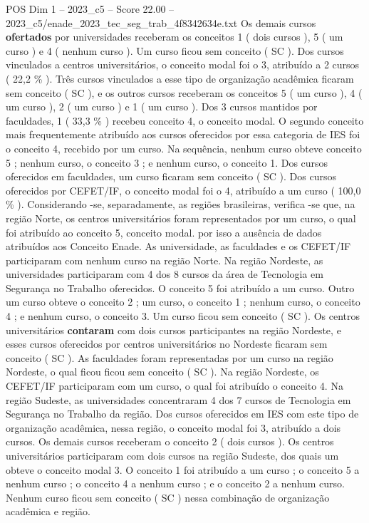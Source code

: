 \begin{textsample}{POS Dim 1 – 2023\_c5 – Score 22.00 – 2023\_c5/enade\_2023\_tec\_seg\_trab\_4f8342634e.txt}
Os demais cursos \textbf{ofertados} por universidades receberam os conceitos 1 ( dois cursos ), 5 ( um curso ) e 4 ( nenhum curso ).
Um curso ficou sem conceito ( SC ).
Dos cursos vinculados a centros universitários, o conceito modal foi o 3, atribuído a 2 cursos ( 22,2 \% ).
Três cursos vinculados a esse tipo de organização acadêmica ficaram sem conceito ( SC ), e os outros cursos receberam os conceitos 5 ( um curso ), 4 ( um curso ), 2 ( um curso ) e 1 ( um curso ).
Dos 3 cursos mantidos por faculdades, 1 ( 33,3 \% ) recebeu conceito 4, o conceito modal.
O segundo conceito mais frequentemente atribuído aos cursos oferecidos por essa categoria de IES foi o conceito 4, recebido por um curso.
Na sequência, nenhum curso obteve conceito 5 ; nenhum curso, o conceito 3 ; e nenhum curso, o conceito 1.
Dos cursos oferecidos em faculdades, um curso ficaram sem conceito ( SC ).
Dos cursos oferecidos por CEFET/IF, o conceito modal foi o 4, atribuído a um curso ( 100,0 \% ).
Considerando -se, separadamente, as regiões brasileiras, verifica -se que, na região Norte, os centros universitários foram representados por um curso, o qual foi atribuído ao conceito 5, conceito modal. por isso a ausência de dados atribuídos aos Conceito Enade.
As universidade, as faculdades e os CEFET/IF participaram com nenhum curso na região Norte.
Na região Nordeste, as universidades participaram com 4 dos 8 cursos da área de Tecnologia em Segurança no Trabalho oferecidos.
O conceito 5 foi atribuído a um curso.
Outro um curso obteve o conceito 2 ; um curso, o conceito 1 ; nenhum curso, o conceito 4 ; e nenhum curso, o conceito 3.
Um curso ficou sem conceito ( SC ).
Os centros universitários \textbf{contaram} com dois cursos participantes na região Nordeste, e esses cursos oferecidos por centros universitários no Nordeste ficaram sem conceito ( SC ).
As faculdades foram representadas por um curso na região Nordeste, o qual ficou ficou sem conceito ( SC ).
Na região Nordeste, os CEFET/IF participaram com um curso, o qual foi atribuído o conceito 4.
Na região Sudeste, as universidades concentraram 4 dos 7 cursos de Tecnologia em Segurança no Trabalho da região.
Dos cursos oferecidos em IES com este tipo de organização acadêmica, nessa região, o conceito modal foi 3, atribuído a dois cursos.
Os demais cursos receberam o conceito 2 ( dois cursos ).
Os centros universitários participaram com dois cursos na região Sudeste, dos quais um obteve o conceito modal 3.
O conceito 1 foi atribuído a um curso ; o conceito 5 a nenhum curso ; o conceito 4 a nenhum curso ; e o conceito 2 a nenhum curso.
Nenhum curso ficou sem conceito ( SC ) nessa combinação de organização acadêmica e região.

\end{textsample}
